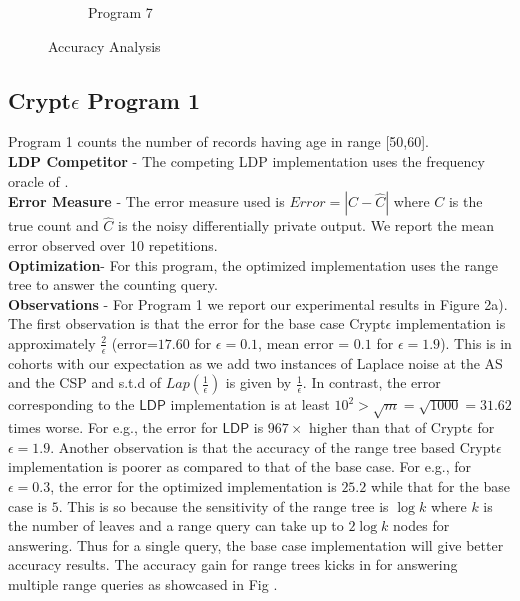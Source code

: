 \begin{figure}
\begin{subfigure}[b]{0.3\textwidth}
        \caption{Program 7}
        \label{fig:mouse}
    \end{subfigure}
   \caption{Accuracy Analysis}
\end{figure}
\subsection*{Crypt$\epsilon$ Program 1}
Program 1 counts the number of records having age in range [50,60].  
\\\textbf{\textsf{LDP} Competitor} - The competing \textsf{LDP} implementation uses the frequency oracle of \cite{LDP1}. 
\\\textbf{Error Measure} - The error measure used is  $Error = |C-\hat{C}|$ where $C$ is the true count and $\hat{C}$ is the noisy differentially private output. We report the mean error observed over 10 repetitions. \\
\textbf{Optimization}- For this program, the optimized implementation uses the range tree to answer the counting query.
\\\textbf{Observations} - For Program 1 we report our experimental results in Figure 2a). The first observation is that the error for the base case Crypt$\epsilon$ implementation is approximately $\frac{2}{\epsilon}$ (error=$17.60$ for $\epsilon=0.1$, mean error = $0.1$ for $\epsilon=1.9$). This is in cohorts with our expectation as we add two instances of Laplace noise at the \textsf{AS} and the \textsf{CSP} and s.t.d of $Lap(\frac{1}{\epsilon})$ is given by $\frac{1}{\epsilon}$. In contrast, the error corresponding to the $\textsf{LDP}$ implementation is at least $10^2 >\sqrt{m}=  \sqrt{1000} = 31.62$ times worse. For e.g., the error for $\textsf{LDP}$ is $967 \times$  higher than that of Crypt$\epsilon$ for $\epsilon=1.9$. Another observation is that the accuracy of the range tree based Crypt$\epsilon$ implementation is poorer as compared to that of the base case. For e.g., for $\epsilon=0.3$, the error for the optimized implementation is $25.2$ while that for the base case is $5$. This is so because the sensitivity of the range tree is $\log k$ where $k$ is the number of leaves and a range query can take up to $2 \log k$ nodes for answering. Thus for a single query, the base case implementation will give better accuracy results. The accuracy gain for range trees kicks in for answering multiple range queries as showcased in Fig .  
